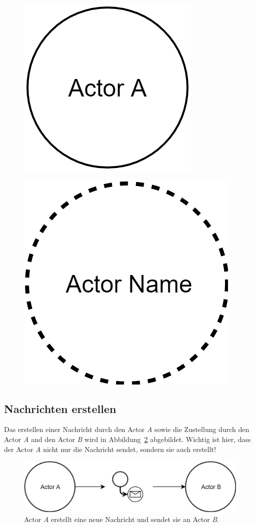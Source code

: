 \begin{figure}
    \centering
    \begin{minipage}{.5\textwidth}
      \centering
      \includegraphics[width=.5\linewidth]{gfx/actor/longLiveActor}
      \label{fig:test1}
    \end{minipage}%
    \begin{minipage}{.5\textwidth}
      \centering
      \includegraphics[width=.5\linewidth]{gfx/actor/shortLiveActor}
      \label{fig:test2}
    \end{minipage}
\end{figure}  

\subsection{Nachrichten erstellen}
Das erstellen einer Nachricht durch den Actor \textit{A} sowie die Zustellung durch den Actor \textit{A} and den Actor \textit{B} wird in Abbildung~\ref{fig:actor:diagram:simpleCreateAndSendMessage} abgebildet. Wichtig ist hier, dass der Actor \textit{A} nicht nur die Nachricht sendet, sondern sie auch erstellt!
\begin{figure}
    \centering
    \includegraphics[width=\linewidth]{gfx/actor/simpleCreateAndSendMessage}
    \caption{Actor \textit{A} erstellt eine neue Nachricht und sendet sie an Actor \textit{B}.}
    \label{fig:actor:diagram:simpleCreateAndSendMessage}
\end{figure}

